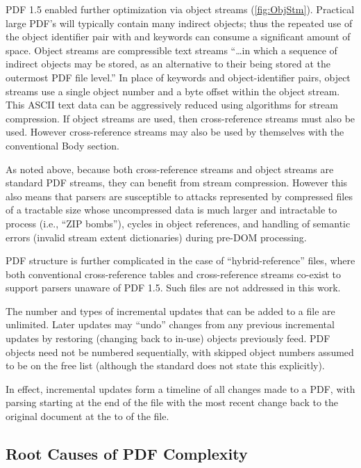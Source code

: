 PDF 1.5 enabled further optimization via object streams (\cref{fig:ObjStm}).
%
Practical large PDF's will typically contain many indirect objects;
%
thus the repeated use of the object identifier pair with 
and  keywords can consume a significant amount of space.
%
Object streams are compressible text streams ``\ldots in which a
sequence of indirect objects may be stored, as an alternative to their
being stored at the outermost PDF file level.''
%
In place of keywords and object-identifier pairs, object streams use a
single object number and a byte offset within the object stream.
%
This ASCII text data can be aggressively reduced using algorithms for
stream compression.
%
If object streams are used, then cross-reference streams must also be
used.
%
However cross-reference streams may also be used by themselves with
the conventional Body section.

As noted above, because both cross-reference streams and object
streams are standard PDF streams, they can benefit from stream
compression. However this also means that parsers are susceptible to
attacks represented by compressed files of a tractable size whose
uncompressed data is much larger and intractable to process (i.e.,
``ZIP bombs''), cycles in object references, and handling of semantic
errors (invalid stream extent dictionaries) during pre-DOM processing.

PDF structure is further complicated in the case of
``hybrid-reference'' files, where both conventional cross-reference
tables and cross-reference streams co-exist to support parsers unaware
of PDF 1.5.
%
Such files are not addressed in this work.

The number and types of incremental updates that can be added to a
file are unlimited.
%
Later updates may ``undo'' changes from any previous incremental
updates by restoring (changing back to in-use) objects previously
feed.
%
PDF objects need not be numbered sequentially, with skipped object
numbers assumed to be on the free list (although the standard does not
state this explicitly).

In effect, incremental updates form a timeline of all changes made to
a PDF, with parsing starting at the end of the file with the most
recent change back to the original document at the to of the file.

\subsection{Root Causes of PDF Complexity}
\label{sec:rootcause}

